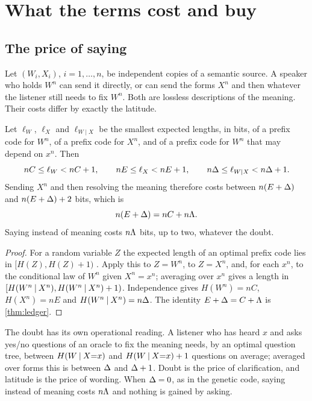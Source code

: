 \section{What the terms cost and buy}\label{sec:operational}
\subsection{The price of saying}
Let $(W_i,X_i)$, $i=1,\dots,n$, be independent copies of a semantic source. A speaker who holds $W^n$ can send it directly, or can send the forms $X^n$ and then whatever the listener still needs to fix $W^n$. Both are lossless descriptions of the meaning. Their costs differ by exactly the latitude.
\begin{theorem}\label{thm:price}
Let $\ell_W$, $\ell_X$ and $\ell_{W\mid X}$ be the smallest expected lengths, in bits, of a prefix code for $W^n$, of a prefix code for $X^n$, and of a prefix code for $W^n$ that may depend on $x^n$. Then
\begin{equation}
nC\le\ell_W<nC+1,\qquad nE\le\ell_X<nE+1,\qquad n\Delta\le\ell_{W\mid X}<n\Delta+1 .
\end{equation}
Sending $X^n$ and then resolving the meaning therefore costs between $n(E+\Delta)$ and $n(E+\Delta)+2$ bits, which is
\begin{equation}
n(E+\Delta)=nC+n\Lambda .
\end{equation}
Saying instead of meaning costs $n\Lambda$ bits, up to two, whatever the doubt.
\end{theorem}
\begin{proof}
For a random variable $Z$ the expected length of an optimal prefix code lies in $[H(Z),H(Z)+1)$ \citep{cover2006,huffman1952}. Apply this to $Z=W^n$, to $Z=X^n$, and, for each $x^n$, to the conditional law of $W^n$ given $X^n=x^n$; averaging over $x^n$ gives a length in $[H(W^n\mathbin{\vert} X^n),H(W^n\mathbin{\vert} X^n)+1)$. Independence gives $H(W^n)=nC$, $H(X^n)=nE$ and $H(W^n\mathbin{\vert} X^n)=n\Delta$. The identity $E+\Delta=C+\Lambda$ is \cref{thm:ledger}.
\end{proof}
The doubt has its own operational reading. A listener who has heard $x$ and asks yes/no questions of an oracle to fix the meaning needs, by an optimal question tree, between $H(W\mathbin{\vert} X{=}x)$ and $H(W\mathbin{\vert} X{=}x)+1$ questions on average; averaged over forms this is between $\Delta$ and $\Delta+1$. Doubt is the price of clarification, and latitude is the price of wording. When $\Delta=0$, as in the genetic code, saying instead of meaning costs $n\Lambda$ and nothing is gained by asking.

